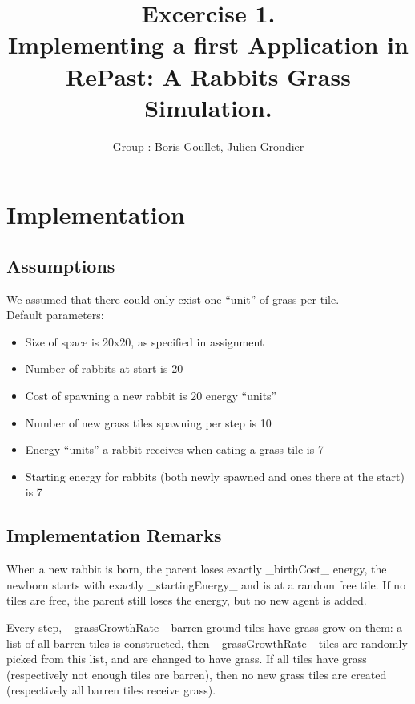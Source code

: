 \documentclass[11pt]{article}
\title{\bf Excercise 1.\\ Implementing a first Application in RePast: A Rabbits Grass Simulation.}
\author{Group \textnumero 25: Boris Goullet, Julien Grondier}
\begin{document}
\maketitle

\section{Implementation}

\subsection{Assumptions}

We assumed that there could only exist one ``unit'' of grass per tile.
\\Default parameters:
\begin{itemize}
\setlength\itemsep{0px}
\item Size of space is 20x20, as specified in assignment
\item Number of rabbits at start is 20
\item Cost of spawning a new rabbit is 20 energy ``units''
\item Number of new grass tiles spawning per step is 10
\item Energy ``units'' a rabbit receives when eating a grass tile is 7
\item Starting energy for rabbits (both newly spawned and ones there at the start) is 7
\end{itemize}

\subsection{Implementation Remarks}
When a new rabbit is born, the parent loses exactly _birthCost_ energy, the newborn starts with exactly _startingEnergy_ and is at a random free tile. If no tiles are free, the parent still loses the energy, but no new agent is added.

Every step, _grassGrowthRate_ barren ground tiles have grass grow on them: a list of all barren tiles is constructed, then _grassGrowthRate_ tiles are randomly picked from this list, and are changed to have grass. If all tiles have grass (respectively not enough tiles are barren), then no new grass tiles are created (respectively all barren tiles receive grass).
\end{document}
